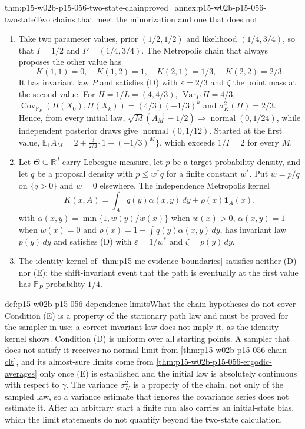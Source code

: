 \begin{hbtheorem}{thm:p15-w02b-p15-056-two-state-chain}{proved=annex:p15-w02b-p15-056-twostate}{Two chains that meet the minorization and one that does not}
\begin{enumerate}
\item Take two parameter values, prior \((1/2,1/2)\) and likelihood
\((1/4,3/4)\), so that \(I=1/2\) and \(P=(1/4,3/4)\). The Metropolis
chain that always proposes the other value has
\[
 K(1,1)=0,\quad K(1,2)=1,\quad K(2,1)=1/3,\quad K(2,2)=2/3 .
\]
It has invariant law \(P\) and satisfies (D) with \(\varepsilon=2/3\) and
\(\zeta\) the point mass at the second value. For \(H=1/L=(4,4/3)\),
\(\operatorname{Var}_PH=4/3\),
\(\operatorname{Cov}_{\mathbb P_P}(H(X_0),H(X_k))=(4/3)(-1/3)^k\) and
\(\sigma^2_K(H)=2/3\). Hence, from every initial law,
\(\sqrt M(A_M^{-1}-1/2)\Rightarrow\operatorname{normal}(0,1/24)\), while
independent posterior draws give \(\operatorname{normal}(0,1/12)\).
Started at the first value,
\(\mathbb E_1A_M=2+\frac3{2M}\{1-(-1/3)^M\}\), which exceeds \(1/I=2\)
for every \(M\).
\item Let \(\Theta\subseteq\mathbb R^d\) carry Lebesgue measure, let
\(p\) be a target probability density, and let \(q\) be a proposal
density with \(p\leq w^*q\) for a finite constant \(w^*\). Put
\(w=p/q\) on \(\{q>0\}\) and \(w=0\) elsewhere. The independence
Metropolis kernel
\[
 K(x,A)=\int_Aq(y)\alpha(x,y)\,dy+\rho(x)\mathbf 1_A(x),
\]
with \(\alpha(x,y)=\min\{1,w(y)/w(x)\}\) when \(w(x)>0\), \(\alpha(x,y)=1\) when \(w(x)=0\) and
\(\rho(x)=1-\int q(y)\alpha(x,y)\,dy\), has invariant law
\(p(y)\,dy\) and satisfies (D) with \(\varepsilon=1/w^*\) and
\(\zeta=p(y)\,dy\).
\item The identity kernel of \cref{thm:p15-mc-evidence-boundaries}
satisfies neither (D) nor (E): the shift-invariant event that the path is
eventually at the first value has \(\mathbb P_P\)-probability \(1/4\).
\end{enumerate}
\end{hbtheorem}

\begin{hbwarning}{def:p15-w02b-p15-056-dependence-limits}{What the chain hypotheses do not cover}
Condition (E) is a property of the stationary path law and must be proved
for the sampler in use; a correct invariant law does not imply it, as the
identity kernel shows. Condition (D) is uniform over all starting points.
A sampler that does not satisfy it receives no normal limit from
\cref{thm:p15-w02b-p15-056-chain-clt}, and its almost-sure limits come
from \cref{thm:p15-w02b-p15-056-ergodic-averages} only once (E) is
established and the initial law is absolutely continuous with respect to
\(\gamma\). The variance \(\sigma^2_K\) is a property of the chain, not
only of the sampled law, so a variance estimate that ignores the
covariance series does not estimate it. After an arbitrary start a finite
run also carries an initial-state bias, which the limit statements do not
quantify beyond the two-state calculation.
\end{hbwarning}

